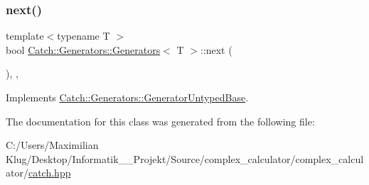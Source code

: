 \subsubsection{\texorpdfstring{next()}{next()}}
{\footnotesize\ttfamily template$<$typename T $>$ \\
bool \mbox{\hyperlink{class_catch_1_1_generators_1_1_generators}{Catch\+::\+Generators\+::\+Generators}}$<$ T $>$\+::next (\begin{DoxyParamCaption}{ }\end{DoxyParamCaption})\hspace{0.3cm}{\ttfamily [inline]}, {\ttfamily [override]}, {\ttfamily [virtual]}}



Implements \mbox{\hyperlink{class_catch_1_1_generators_1_1_generator_untyped_base_aeed3c0cd6233c5f553549e453b8d6638}{Catch\+::\+Generators\+::\+Generator\+Untyped\+Base}}.



The documentation for this class was generated from the following file\+:\begin{DoxyCompactItemize}
\item 
C\+:/\+Users/\+Maximilian Klug/\+Desktop/\+Informatik\+\_\+\_\+\+Projekt/\+Source/complex\+\_\+calculator/complex\+\_\+calculator/\mbox{\hyperlink{catch_8hpp}{catch.\+hpp}}\end{DoxyCompactItemize}

